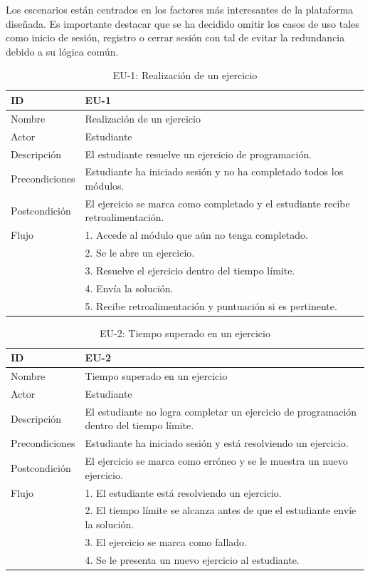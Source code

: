 Los escenarios están centrados en los factores más interesantes de la plataforma diseñada. Es importante destacar que se ha decidido omitir los casos de uso tales como inicio de sesión, registro o cerrar sesión con tal de evitar la redundancia debido a su lógica común. 

\begin{table}[H]
    \centering
    \begin{tabularx}{\textwidth}{|l|X|}
    \hline
    ID & EU-1 \\
    \hline
    Nombre & Realización de un ejercicio \\
    \hline
    Actor & Estudiante \\
    \hline
    Descripción & El estudiante resuelve un ejercicio de programación. \\
    \hline
    Precondiciones & Estudiante ha iniciado sesión y no ha completado todos los módulos. \\
    \hline
    Postcondición & El ejercicio se marca como completado y el estudiante recibe retroalimentación. \\
    \hline
    Flujo & 
    1. Accede al módulo que aún no tenga completado. \\
    & 2. Se le abre un ejercicio. \\
    & 3. Resuelve el ejercicio dentro del tiempo límite. \\
    & 4. Envía la solución. \\
    & 5. Recibe retroalimentación y puntuación si es pertinente. \\
    \hline
    \end{tabularx}
    \caption{EU-1: Realización de un ejercicio}
\end{table}

\begin{table}[H]
    \centering
    \begin{tabularx}{0.9\textwidth}{|l|X|}
    \hline
    ID & EU-2 \\
    \hline
    Nombre & Tiempo superado en un ejercicio \\
    \hline
    Actor & Estudiante \\
    \hline
    Descripción & El estudiante no logra completar un ejercicio de programación dentro del tiempo límite. \\
    \hline
    Precondiciones & Estudiante ha iniciado sesión y está resolviendo un ejercicio. \\
    \hline
    Postcondición & El ejercicio se marca como erróneo y se le muestra un nuevo ejercicio. \\
    \hline
    Flujo & 
    1. El estudiante está resolviendo un ejercicio. \\
    & 2. El tiempo límite se alcanza antes de que el estudiante envíe la solución. \\
    & 3. El ejercicio se marca como fallado. \\
    & 4. Se le presenta un nuevo ejercicio al estudiante. \\
    \hline
    \end{tabularx}
    \caption{EU-2: Tiempo superado en un ejercicio}
\end{table}

